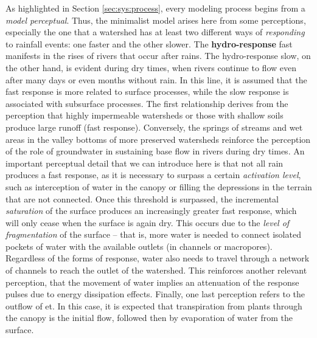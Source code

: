 \documentclass[./main_en.tex]{subfiles}
\begin{document}
\par As highlighted in Section \ref{sec:sys:process}, every modeling process begins from a \textit{\gls{model} perceptual}. Thus, the minimalist \gls{model} arises here from some perceptions, especially the one that a watershed has at least two different ways of \textit{responding} to rainfall events: one faster and the other slower. The \textbf{\gls{hydro-response}} fast manifests in the rises of rivers that occur after rains. The \gls{hydro-response} slow, on the other hand, is evident during dry times, when rivers continue to flow even after many days or even months without rain. In this line, it is assumed that the fast response is more related to surface processes, while the slow response is associated with subsurface processes. The first relationship derives from the perception that highly impermeable watersheds or those with shallow soils produce large runoff (fast response). Conversely, the springs of streams and wet areas in the valley bottoms of more preserved watersheds reinforce the perception of the role of groundwater in sustaining base flow in rivers during dry times. An important perceptual detail that we can introduce here is that not all rain produces a fast response, as it is necessary to surpass a certain \textit{activation level}, such as \gls{interception} of water in the canopy or filling the depressions in the terrain that are not connected. Once this threshold is surpassed, the incremental \textit{saturation} of the surface produces an increasingly greater fast response, which will only cease when the surface is again dry. This occurs due to the \textit{level of fragmentation} of the surface -- that is, more water is needed to connect isolated pockets of water with the available outlets (in channels or macropores). Regardless of the forms of response, water also needs to travel through a network of channels to reach the outlet of the watershed. This reinforces another relevant perception, that the movement of water implies an attenuation of the response pulses due to energy dissipation effects. Finally, one last perception refers to the outflow of \acrfull{et}. In this case, it is expected that transpiration from plants through the canopy is the initial flow, followed then by evaporation of water from the surface.
\end{document}
